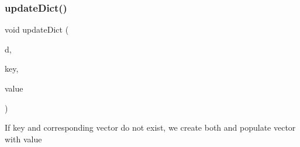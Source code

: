 \subsubsection{\texorpdfstring{update\+Dict()}{updateDict()}}
{\footnotesize\ttfamily void update\+Dict (\begin{DoxyParamCaption}\item[{std\+::map$<$ \mbox{\hyperlink{typedefs_8cpp_a58a0c7cf2501f4492da833421be92547}{real}}, \mbox{\hyperlink{typedefs_8cpp_a84b6d9a0fbb45e01ad4a3aa5667f2992}{Real\+Vec}} $>$ \&}]{d,  }\item[{const \mbox{\hyperlink{typedefs_8cpp_a58a0c7cf2501f4492da833421be92547}{real}} \&}]{key,  }\item[{const \mbox{\hyperlink{typedefs_8cpp_a58a0c7cf2501f4492da833421be92547}{real}} \&}]{value }\end{DoxyParamCaption})}

If key and corresponding vector do not exist, we create both and populate vector with value 